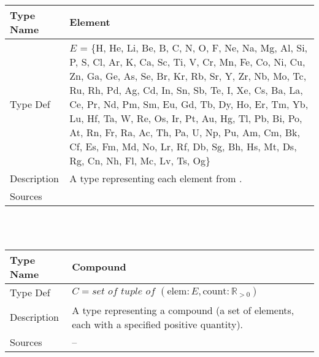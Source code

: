 \documentclass[12pt]{article}
\newcommand*{\posReal}{\mathbb{R}_{> 0}}
\newcommand{\colAwidth}{0.13\textwidth}
\newcommand{\colBwidth}{0.82\textwidth}
\begin{document}
~\newline
\noindent
\begin{minipage}{\textwidth}
  \renewcommand*{\arraystretch}{1.5}
  \begin{tabular}{| p{\colAwidth} | p{\colBwidth}|}
    \hline
    \rowcolor[gray]{0.9}
    Type Name   & Element                                                   \\
    \hline
    Type Def    & $E$ = \{H, He, Li, Be, B, C, N, O, F, Ne, Na, Mg, Al, Si,
    P, S, Cl, Ar, K, Ca, Sc, Ti, V, Cr, Mn, Fe, Co, Ni, Cu, Zn, Ga, Ge, As, Se,
    Br, Kr, Rb, Sr, Y, Zr, Nb, Mo, Tc, Ru, Rh, Pd, Ag, Cd, In, Sn, Sb, Te, I,
    Xe, Cs, Ba, La, Ce, Pr, Nd, Pm, Sm, Eu, Gd, Tb, Dy, Ho, Er, Tm, Yb, Lu, Hf,
    Ta, W, Re, Os, Ir, Pt, Au, Hg, Tl, Pb, Bi, Po, At, Rn, Fr, Ra, Ac, Th, Pa,
    U, Np, Pu, Am, Cm, Bk, Cf, Es, Fm, Md, No, Lr, Rf, Db, Sg, Bh, Hs, Mt, Ds,
    Rg, Cn, Nh, Fl, Mc, Lv, Ts, Og\}                                        \\

    \hline
    Description & A type representing each element from
    \cite{wikipedia_list_2023}.                                             \\
    \hline
    Sources     & \cite{smith_assignment_2020}                              \\
    \hline
  \end{tabular}
\end{minipage}\\

~\newline
\noindent
\begin{minipage}{\textwidth}
  \renewcommand*{\arraystretch}{1.5}
  \begin{tabular}{| p{\colAwidth} | p{\colBwidth}|}
    \hline
    \rowcolor[gray]{0.9}
    Type Name   & Compound                                                    \\
    \hline
    Type Def    &
    $C = \textit{set of tuple of }(\text{elem} : E, \text{count} : \posReal)$ \\
    \hline
    Description & A type representing a compound (a set of elements, each
    with a specified positive quantity).                                      \\
    \hline
    Sources     & --                                                          \\
    \hline
  \end{tabular}
\end{minipage}\\
\end{document}

